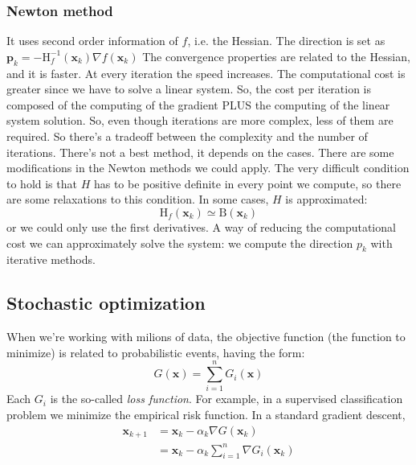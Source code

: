 \documentclass[11pt]{article}
\begin{document}
\subsubsection{Newton method}
It uses second order information of $f$, i.e. the Hessian.
The direction is set as $\mathbf{p}_{k}=-\mathrm{H}_{f}^{-1}\left(\mathbf{x}_{k}\right) \nabla f\left(\mathbf{x}_{k}\right)$
The convergence properties are related to the Hessian, and it is faster. At every iteration the speed increases. The computational cost is greater since we have to solve a linear system.
So, the cost per iteration is composed of the computing of the gradient PLUS the computing of the linear system solution. So, even though iterations are more complex, less of them are required. So there's a tradeoff between the complexity and the number of iterations.
There's not a best method, it depends on the cases.
There are some modifications in the Newton methods we could apply. The very difficult condition to hold is that $H$ has to be positive definite in every point we compute, so there are some relaxations to this condition. In some cases, $H$ is approximated:
\begin{displaymath}
    \mathrm{H}_{f}\left(\mathbf{x}_{k}\right) \simeq \mathrm{B}\left(\mathbf{x}_{k}\right)
\end{displaymath}
or we could only use the first derivatives.
A way of reducing the computational cost we can approximately solve the system: we compute the direction $p_k$ with iterative methods.
\subsection{Stochastic optimization}
When we're working with milions of data, the objective function (the function to minimize) is related to probabilistic events, having the form:
\begin{displaymath}
    G(\mathbf{x})=\sum_{i=1}^{n} G_{i}(\mathbf{x})
\end{displaymath}
Each $G_i$ is the so-called \textit{loss function}. For example, in a supervised classification problem we minimize the empirical risk function. In a standard gradient descent,
\begin{displaymath}
\begin{aligned}
    \mathbf{x}_{k+1} &=\mathbf{x}_{k}-\alpha_{k} \nabla G\left(\mathbf{x}_{k}\right) \\
    &=\mathbf{x}_{k}-\alpha_{k} \sum_{i=1}^{n} \nabla G_{i}\left(\mathbf{x}_{k}\right)
    \end{aligned}
\end{displaymath}
\end{document}
